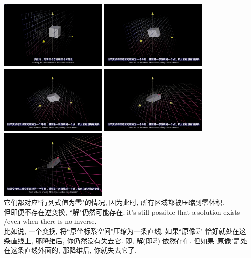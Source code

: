 \documentclass[UTF8]{ctexart}
\begin{document}
\includegraphics[width=0.4\textwidth]{img/0054.png} 
\includegraphics[width=0.4\textwidth]{img/0055.png} \\
\includegraphics[width=0.4\textwidth]{img/0056.png} 
\includegraphics[width=0.4\textwidth]{img/0057.png} \\
\includegraphics[width=0.4\textwidth]{img/0058.png} \\

它们都对应``行列式值为零"的情况, 因为此时, 所有区域都被压缩到零体积. \\

但即便不存在逆变换, ``解"仍然可能存在. it's still possible that a solution exists /even when there is no inverse. \\
比如说, 一个变换, 将``原坐标系空间"压缩为一条直线, 如果``原像$\vec{x}$" 恰好就处在这条直线上, 那降维后, 你仍然没有失去它. 即, 解(即$\vec{x}$) 依然存在. 但如果``原像"是处在这条直线外面的, 那降维后, 你就失去它了.\\
\end{document}
